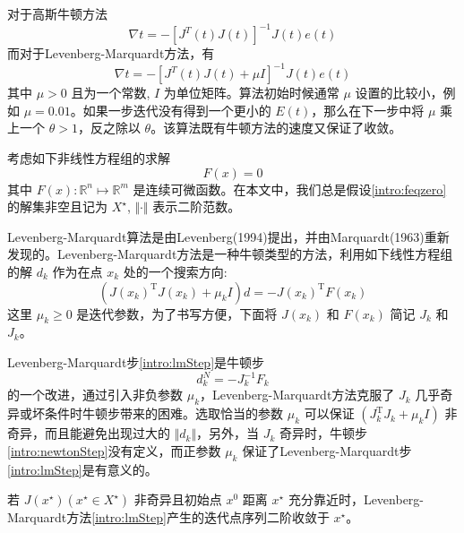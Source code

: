 对于高斯牛顿方法
\begin{equation}
    \nabla t = - \left[ J ^ { T } ( t ) J ( t ) \right] ^ { - 1 } J ( t ) e ( t )
    \label{intro:newtonGrad}
\end{equation}
而对于Levenberg-Marquardt方法，有
\begin{equation}
    \nabla t = - \left[ J ^ { T } ( t ) J ( t ) + \mu I \right] ^ { - 1 } J ( t ) e ( t )
    \label{intro:lmGrad}
\end{equation}
其中 $\mu > 0$ 且为一个常数, $I$ 为单位矩阵。算法初始时候通常 $\mu$ 设置的比较小，例如 $\mu = 0.01$。如果一步迭代没有得到一个更小的 $E(t)$，那么在下一步中将 $\mu$ 乘上一个 $\theta > 1$，反之除以 $\theta$。该算法既有牛顿方法的速度又保证了收敛。


考虑如下非线性方程组的求解
\begin{equation}
    F(x) = 0
    \label{intro:feqzero}
\end{equation}
其中 $F(x): \mathbb{R}^n \mapsto \mathbb{R}^m$ 是连续可微函数。在本文中，我们总是假设\ref{intro:feqzero}的解集非空且记为 $X^{\star}$, $\Vert\cdot\Vert$ 表示二阶范数。


Levenberg-Marquardt算法是由Levenberg(1994)提出，并由Marquardt(1963)重新发现的。Levenberg-Marquardt方法是一种牛顿类型的方法，利用如下线性方程组的解 $d_k$ 作为在点 $x_k$ 处的一个搜索方向:
\begin{equation}
    (J(x_k)^{\mathrm{T}} J(x_k) + \mu_k I) d = -J(x_k)^{\mathrm{T}}F(x_k)
    \label{intro:lmStep}
\end{equation}
这里 $\mu_k \geq 0$ 是迭代参数，为了书写方便，下面将 $J(x_k)$ 和 $F(x_k)$ 简记 $J_k$ 和 $J_k$。


Levenberg-Marquardt步\ref{intro:lmStep}是牛顿步
\begin{equation}
    d_k^N = -J_k^{-1} F_k
    \label{intro:newtonStep}
\end{equation}
的一个改进，通过引入非负参数 $\mu_k$，Levenberg-Marquardt方法克服了 $J_k$ 几乎奇异或坏条件时牛顿步带来的困难。选取恰当的参数 $\mu_k$ 可以保证 $(J_k^{\mathrm{T}}J_k + \mu_k I)$ 非奇异，而且能避免出现过大的 $\Vert d_k\Vert$，另外，当 $J_k$ 奇异时，牛顿步\ref{intro:newtonStep}没有定义，而正参数 $\mu_k$ 保证了Levenberg-Marquardt步\ref{intro:lmStep}是有意义的。


若 $J(x^{\star}) (x^{\star} \in X^{\star})$ 非奇异且初始点 $x^0$ 距离 $x^\star$ 充分靠近时，Levenberg-Marquardt方法\ref{intro:lmStep}产生的迭代点序列二阶收敛于 $x^\star$。


